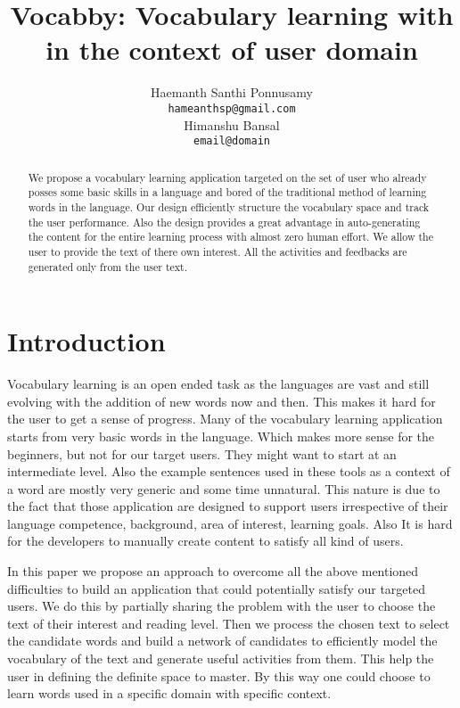 \documentclass[11pt,a4paper]{article}
\title{Vocabby: Vocabulary learning with in the context of user domain}
\author{Haemanth Santhi Ponnusamy \\
  {\tt hameanthsp@gmail.com} \\\And
  Himanshu Bansal \\
  {\tt email@domain}}
\date{}
\begin{document}
\maketitle
\begin{abstract}
  We propose a vocabulary learning application targeted on the set of user
  who already posses some basic skills in a language and bored of the
  traditional method of learning words in the language. Our design 
  efficiently structure the vocabulary space and track the user performance.
  Also the design provides a great advantage in auto-generating the content
  for the entire learning process with almost zero human effort. We allow the
  user to provide the text of there own interest. All the activities and
  feedbacks are generated only from the user text.

\end{abstract}

\section{Introduction}
Vocabulary learning is an open ended task as the languages are vast and still
evolving with the addition of new words now and then. This makes it hard for the
user to get a sense of progress. Many of the vocabulary learning application 
starts from very basic words in the language. Which makes more sense for the 
beginners, but not for our target users. They might want to start at an
intermediate level. Also the example sentences used in these tools as a context
of a word are mostly very generic and some time unnatural. This nature is due to the
fact that those application are designed to support users irrespective of their
language competence, background, area of interest, learning goals. Also It is
hard for the developers to manually create content to satisfy all kind of users.

In this paper we propose an approach to overcome all the above mentioned
difficulties to build an application that could potentially satisfy our targeted
users. We do this by partially sharing the problem with the user to choose the 
text of their interest and reading level. Then we process the chosen text to
select the candidate words and build a network of candidates to efficiently model
the vocabulary of the text and generate useful activities from them. This help
the user in defining the definite space to master. By this way one
could choose to learn words used in a specific domain with specific context.
\end{document}
